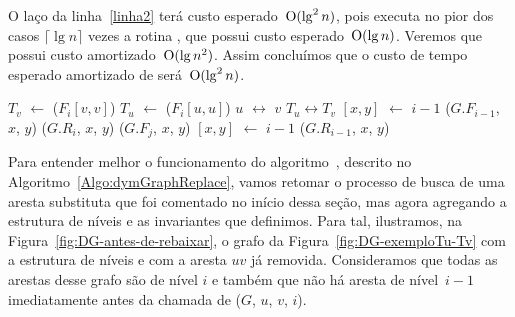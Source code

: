 O laço da linha~\ref{linha2} terá custo esperado~$\mathrm{O}(\lg^2 n)$, pois executa no pior dos casos $\lceil \lg n \rceil$ vezes a rotina \dymForestDelEdge{}, que possui custo esperado~$\mathrm{O}(\lg n)$.
Veremos que \dymGraphReplace{} possui custo amortizado~$\mathrm{O}(\lg n^2)$. Assim concluímos que o custo de tempo esperado amortizado de \dymGraphDelEdge{} será~$\mathrm{O}(\lg^2 n)$.

\begin{algorithm}
\caption{\dymGraphReplace($G$, $u$, $v$, $niv$)}
\label{Algo:dymGraphReplace}
\begin{algorithmic}[1]
\label{Algo:dymGraphReplace:linha:primeira}
\State $T_v$ $\gets$  \treapGetRoot($F_i[v,v]$)
\State $T_u$ $\gets$  \treapGetRoot($F_i[u,u]$)
\State $u$ $\leftrightarrow$ $v$
\State $T_u \leftrightarrow T_v$
\EndIf
{}\label{Algo:dymGraphReplace:linha:moveTu}
\State \nivel$[x,y]$ $\gets$ $i-1$ \label{Algo:dymGraphReplace:linha:moveTu2}
\State \dymForestAddEdge($G$.$F_{i-1}$, $x$, $y$) \label{Algo:dymGraphReplace:linha:moveTu3}
\EndFor
{}\label{Algo:dymGraphReplace:linha:achaSub}
\State \graphDel($G$.$R_i$, $x$, $y$)
\label{Algo:dymGraphReplace:linha:inseresub}
\State \dymForestAddEdge($G$.$F_j$, $x$, $y$)
\EndFor
\State \Return
\Else
\State \nivel$[x,y]$ $\gets$ $i-1$ \label{Algo:dymGraphReplace:linha:rebaixar}
\State \graphAdd($G$.$R_{i-1}$, $x$, $y$) \label{Algo:dymGraphReplace:linha:rebaixar2}
\EndIf
\EndFor
\EndFor\label{Algo:dymGraphReplace:linha:ultima}
\end{algorithmic}
\end{algorithm}

Para entender melhor o funcionamento do algoritmo~\dymGraphReplace{}, descrito no Algoritmo~\ref{Algo:dymGraphReplace}, vamos retomar o processo de busca de uma aresta substituta que foi comentado no início dessa seção, mas agora agregando a estrutura de níveis e as invariantes que definimos. Para tal, ilustramos, na Figura~\ref{fig:DG-antes-de-rebaixar}, o grafo da Figura~\ref{fig:DG-exemploTu-Tv} com a estrutura de níveis e com a aresta $uv$ já removida. Consideramos que todas as arestas desse grafo são de nível $i$ e também que não há aresta de nível~$i-1$ imediatamente antes da chamada de \dymGraphReplace($G$, $u$, $v$, $i$).

